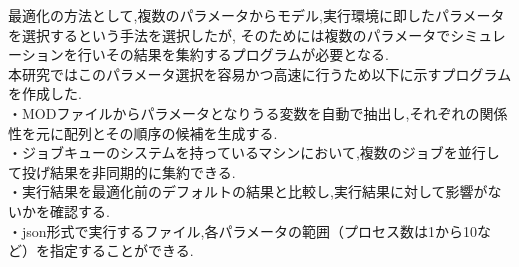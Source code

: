 最適化の方法として,複数のパラメータからモデル,実行環境に即したパラメータを選択するという手法を選択したが,
そのためには複数のパラメータでシミュレーションを行いその結果を集約するプログラムが必要となる.\\
本研究ではこのパラメータ選択を容易かつ高速に行うため以下に示すプログラムを作成した.\\
・MODファイルからパラメータとなりうる変数を自動で抽出し,それぞれの関係性を元に配列とその順序の候補を生成する.\\
・ジョブキューのシステムを持っているマシンにおいて,複数のジョブを並行して投げ結果を非同期的に集約できる.\\
・実行結果を最適化前のデフォルトの結果と比較し,実行結果に対して影響がないかを確認する.\\
・json形式で実行するファイル,各パラメータの範囲（プロセス数は1から10など）を指定することができる.\\
